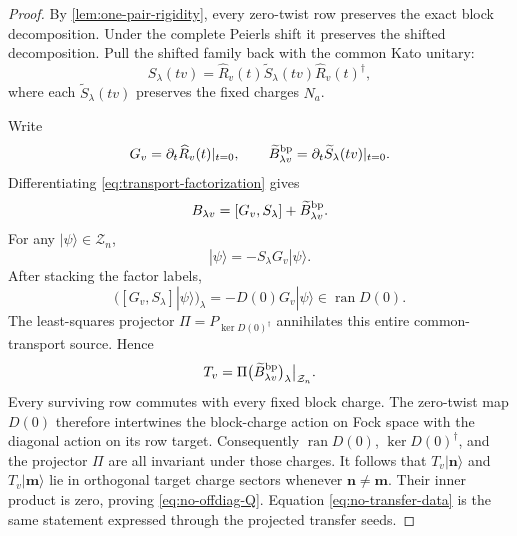 \documentclass[11pt]{article}
\theoremstyle{remark}
\newcommand{\cZ}{\mathcal Z}
\newcommand{\bn}{\mathbf n}
\begin{document}
\begin{proof}
By \cref{lem:one-pair-rigidity}, every zero-twist row preserves the exact block
decomposition.  Under the complete Peierls shift it preserves the shifted
decomposition.  Pull the shifted family back with the common Kato unitary:
\begin{equation}
 S_\lambda(tv)
 =\widehat R_v(t)\widetilde S_\lambda(tv)\widehat R_v(t)^\dagger,
 \label{eq:transport-factorization}
\end{equation}
where each $\widetilde S_\lambda(tv)$ preserves the fixed charges $N_a$.

Write
\begin{equation}
 G_v=\partial_t\widehat R_v(t)|_{t=0},
 \qquad
 \widetilde B_{\lambda v}^{\rm bp}
 =\partial_t\widetilde S_\lambda(tv)|_{t=0}.
\end{equation}
Differentiating \eqref{eq:transport-factorization} gives
\begin{equation}
 B_{\lambda v}
 =[G_v,S_\lambda]+\widetilde B_{\lambda v}^{\rm bp}.
 \label{eq:source-split}
\end{equation}
For any $|\psi\rangle\in\cZ_n$,
\begin{equation}
 [G_v,S_\lambda]|\psi\rangle
 =-S_\lambda G_v|\psi\rangle.
\end{equation}
After stacking the factor labels,
\begin{equation}
 \bigl([G_v,S_\lambda]|\psi\rangle\bigr)_\lambda
 =-D(0)G_v|\psi\rangle
 \in\operatorname{ran}D(0).
 \label{eq:comm-source-range}
\end{equation}
The least-squares projector $\Pi=P_{\ker D(0)^\dagger}$ annihilates this
entire common-transport source.  Hence
\begin{equation}
 T_v
 =\Pi\bigl(\widetilde B_{\lambda v}^{\rm bp}\bigr)_\lambda
 \big|_{\cZ_n}.
 \label{eq:T-bp}
\end{equation}
Every surviving row commutes with every fixed block charge.  The zero-twist
map $D(0)$ therefore intertwines the block-charge action on Fock space with the
diagonal action on its row target.  Consequently $\operatorname{ran}D(0)$,
$\ker D(0)^\dagger$, and the projector $\Pi$ are all invariant under those
charges.  It follows that $T_v|\bn\rangle$ and
$T_v|\mathbf m\rangle$ lie in orthogonal target charge sectors whenever
$\bn\ne\mathbf m$.  Their inner product is zero, proving
\eqref{eq:no-offdiag-Q}.  Equation \eqref{eq:no-transfer-data} is the same
statement expressed through the projected transfer seeds.
\end{proof}
\end{document}
